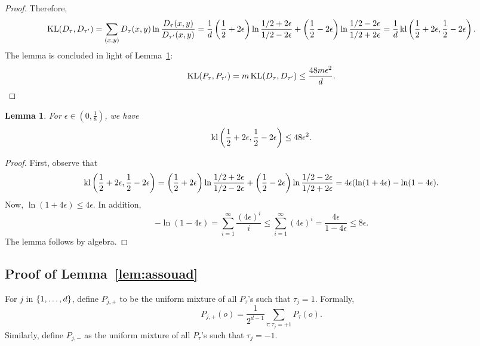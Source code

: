 \documentclass{article}
\newtheorem{lemma}{Lemma}
\DeclareMathOperator*{\kl}{{\rm kl}}
\DeclareMathOperator*{\KL}{{\rm KL}}
\newcommand{\EE}{\mathbb{E}}
\newcommand*{\one}{{\bf 1}}
\begin{document}
\begin{proof}
Therefore,
\begin{eqnarray*}
  \KL(D_\tau, D_{\tau'})
  = \sum_{(x,y)} D_\tau(x,y) \ln\frac{D_\tau(x,y)}{D_{\tau'}(x,y)}
  = \frac{1}{d} \del{\frac12+2\epsilon} \ln\frac{1/2+2\epsilon}{1/2-2\epsilon} +
                \del{\frac12-2\epsilon} \ln\frac{1/2-2\epsilon}{1/2+2\epsilon}
  = \frac{1}{d} \kl\del{\frac12+2\epsilon, \frac12-2\epsilon}.
\end{eqnarray*}
The lemma is concluded in light of Lemma~\ref{lem:centr-kl}:
\[ \KL(P_{\tau}, P_{\tau'}) = m \KL(D_\tau, D_{\tau'}) \leq \frac{48 m \epsilon^2}{d}. \qedhere \]
\end{proof}



\begin{lemma}
For $\epsilon \in (0,\frac18)$, we have
\[ \kl\del{\frac12+2\epsilon, \frac12-2\epsilon} \leq 48\epsilon^2. \]
\label{lem:centr-kl}
\end{lemma}
\begin{proof}
First, observe that
\[ \kl\del{\frac12+2\epsilon, \frac12-2\epsilon} =
\del{\frac12+2\epsilon} \ln\frac{1/2+2\epsilon}{1/2-2\epsilon} +
\del{\frac12-2\epsilon} \ln\frac{1/2-2\epsilon}{1/2+2\epsilon}
= 4\epsilon(\ln(1+4\epsilon) - \ln(1-4\epsilon).
\]
Now, $\ln(1+4\epsilon) \leq 4\epsilon$. In addition,
\[ -\ln(1-4\epsilon) = \sum_{i=1}^\infty \frac{(4\epsilon)^i}{i} \leq \sum_{i=1}^\infty (4\epsilon)^i = \frac{4\epsilon}{1-4\epsilon} \leq 8\epsilon. \]
The lemma follows by algebra.
\end{proof}


\subsection{Proof of Lemma~\ref{lem:assouad}}
For $j$ in $\cbr{1,\ldots,d}$, define $P_{j,+}$ to be the uniform mixture of all $P_\tau$'s such that $\tau_j = 1$. Formally,
\[ P_{j,+}(o) = \frac{1}{2^{d-1}} \sum_{\tau: \tau_j = +1} P_\tau(o). \]
Similarly, define $P_{j,-}$ as the uniform mixture of all $P_\tau$'s such that $\tau_j = -1$.
\end{document}
